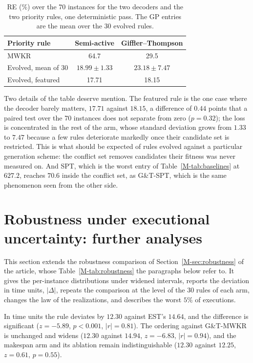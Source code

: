 \documentclass[11pt]{article}
\begin{document}
\begin{table}[!htb]
\centering\small
\caption{RE (\%) over the 70 instances for the two decoders and the
two priority rules, one deterministic pass. The GP entries are the mean
over the 30 evolved rules.}
\label{tab:decoder}
\begin{tabular}{lcc}
\toprule
Priority rule & Semi-active & Giffler--Thompson \\
\midrule
MWKR & 64.7 & 29.5 \\
Evolved, mean of 30 & $\mathbf{18.99} \pm 1.33$ & $23.18 \pm 7.47$ \\
Evolved, featured & 17.71 & 18.15 \\
\bottomrule
\end{tabular}
\end{table}

Two details of the table deserve mention. The featured rule is
the one case where the decoder barely matters, $17.71$ against $18.15$,
a difference of $0.44$ points that a paired test over the 70 instances
does not separate from zero ($p = 0.32$); the loss is concentrated in
the rest of the arm, whose standard deviation grows from $1.33$ to
$7.47$ because a few rules deteriorate markedly once their candidate set is restricted. This is what should be expected of rules evolved against a
particular generation scheme: the conflict set removes candidates their
fitness was never measured on. And SPT, which is the worst entry of
Table~\ref{M-tab:baselines} at $627.2$, reaches $70.6$ inside the
conflict set, as G\&T-SPT, which is the same phenomenon seen from the
other side.

\section{Robustness under executional uncertainty: further analyses}
\label{sec:robdetail}

This section extends the robustness comparison of Section~\ref{M-sec:robustness} of the article, whose Table~\ref{M-tab:robustness} the paragraphs below refer to. It gives the per-instance distributions under widened intervals, reports the deviation in time units, $|\Delta|$, repeats the comparison at the level of the 30 rules of each arm, changes the law of the realizations, and describes the worst $5\%$ of executions.

In time units the rule deviates by $12.30$ against EST's $14.64$, and
the difference is significant ($z=-5.89$,
$p<0.001$, $|r|=0.81$). The ordering against G\&T-MWKR is unchanged and
widens ($12.30$ against $14.94$, $z=-6.83$, $|r|=0.94$), and the
makespan arm and its ablation remain indistinguishable ($12.30$ against
$12.25$, $z=0.61$, $p=0.55$).
\end{document}
